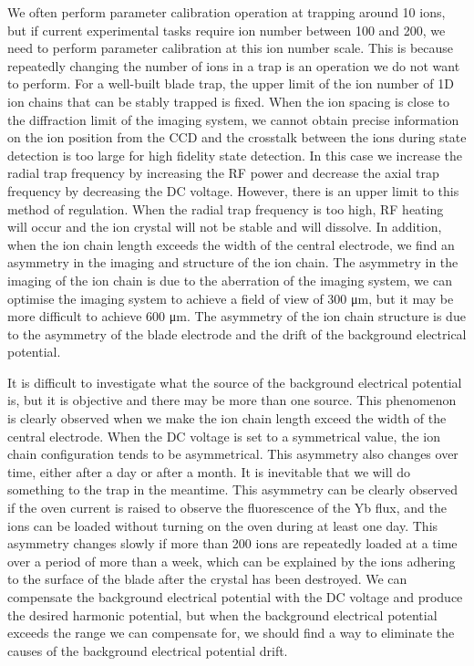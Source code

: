 We often perform parameter calibration operation at trapping around 10 ions, but if current experimental tasks require ion number between 100 and 200, we need to perform parameter calibration at this ion number scale. This is because repeatedly changing the number of ions in a trap is an operation we do not want to perform. For a well-built blade trap, the upper limit of the ion number of 1D ion chains that can be stably trapped is fixed. When the ion spacing is close to the diffraction limit of the imaging system, we cannot obtain precise information on the ion position from the CCD and the crosstalk between the ions during state detection is too large for high fidelity state detection. In this case we increase the radial trap frequency by increasing the RF power and decrease the axial trap frequency by decreasing the DC voltage. However, there is an upper limit to this method of regulation. When the radial trap frequency is too high, RF heating will occur and the ion crystal will not be stable and will dissolve. In addition, when the ion chain length exceeds the width of the central electrode, we find an asymmetry in the imaging and structure of the ion chain. The asymmetry in the imaging of the ion chain is due to the aberration of the imaging system, we can optimise the imaging system to achieve a field of view of 300 μm, but it may be more difficult to achieve 600 μm. The asymmetry of the ion chain structure is due to the asymmetry of the blade electrode and the drift of the background electrical potential.

It is difficult to investigate what the source of the background electrical potential is, but it is objective and there may be more than one source. This phenomenon is clearly observed when we make the ion chain length exceed the width of the central electrode. When the DC voltage is set to a symmetrical value, the ion chain configuration tends to be asymmetrical. This asymmetry also changes over time, either after a day or after a month. It is inevitable that we will do something to the trap in the meantime. This asymmetry can be clearly observed if the oven current is raised to observe the fluorescence of the Yb flux, and the ions can be loaded without turning on the oven during at least one day. This asymmetry changes slowly if more than 200 ions are repeatedly loaded at a time over a period of more than a week, which can be explained by the ions adhering to the surface of the blade after the crystal has been destroyed. We can compensate the background electrical potential with the DC voltage and produce the desired harmonic potential, but when the background electrical potential exceeds the range we can compensate for, we should find a way to eliminate the causes of the background electrical potential drift.

